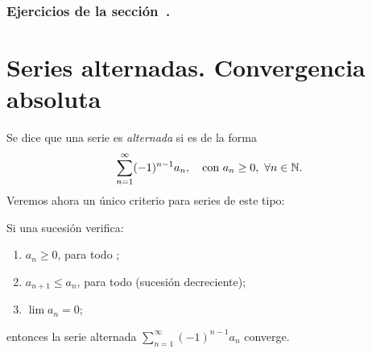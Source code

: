 \subsubsection*{Ejercicios de la sección~.}

\begin{enumerate}

\end{enumerate}

\section{Series alternadas. Convergencia absoluta}

Se dice que una serie es \emph{alternada} si es de la forma
\[
\sum_{n=1}^\infty (-1)^{n-1} a_n, \quad \text{con } a_n\ge 0,\ \forall {\ensuremath{n\in\mathbb{N}}}.
\]
Veremos ahora un único criterio para series de este tipo:

\begin{proposition}
    Si una sucesión \sucan verifica:
    \begin{enumerate}
        \item $a_n\ge 0$, para todo \niN;
        \item $a_{n+1} \le a_n$, para todo \niN (sucesión decreciente);
        \item $\lim a_n = 0$;
    \end{enumerate}
    entonces la serie alternada $\sum_{n=1}^\infty (-1)^{n-1} a_n$ converge.
\end{proposition}

